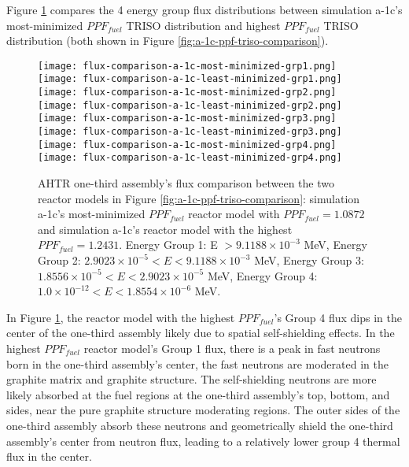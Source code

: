 Figure \ref{fig:a-1c-flux-comparison} compares the 4 energy group flux distributions 
between simulation a-1c's most-minimized $PPF_{fuel}$ TRISO distribution and highest 
$PPF_{fuel}$ TRISO distribution (both shown in Figure \ref{fig:a-1c-ppf-triso-comparison}). 
\begin{figure}[htbp!]
    \centering
    \texttt{[image: flux-comparison-a-1c-most-minimized-grp1.png]} 
    \texttt{[image: flux-comparison-a-1c-least-minimized-grp1.png]} 
    \texttt{[image: flux-comparison-a-1c-most-minimized-grp2.png]} 
    \texttt{[image: flux-comparison-a-1c-least-minimized-grp2.png]} 
    \texttt{[image: flux-comparison-a-1c-most-minimized-grp3.png]} 
    \texttt{[image: flux-comparison-a-1c-least-minimized-grp3.png]} 
    \texttt{[image: flux-comparison-a-1c-most-minimized-grp4.png]} 
    \texttt{[image: flux-comparison-a-1c-least-minimized-grp4.png]} 
    \caption{AHTR one-third assembly's flux comparison between the two reactor models 
    in Figure \ref{fig:a-1c-ppf-triso-comparison}: simulation a-1c's most-minimized 
    $PPF_{fuel}$ reactor model with $PPF_{fuel} = 1.0872$ and simulation a-1c's reactor 
    model with the highest $PPF_{fuel} = 1.2431$.
    Energy Group 1: E $> 9.1188 \times 10^{-3}$ MeV, 
    Energy Group 2: $2.9023 \times 10^{-5} < E < 9.1188 \times 10^{-3}$ MeV,
    Energy Group 3:  $1.8556 \times 10^{-5} < E < 2.9023 \times 10^{-5}$ MeV,
    Energy Group 4:  $1.0 \times 10^{-12} < E < 1.8554 \times 10^{-6}$ MeV.}
    \label{fig:a-1c-flux-comparison}
\end{figure}
In Figure \ref{fig:a-1c-flux-comparison}, the reactor model with the highest 
$PPF_{fuel}$'s Group 4 flux dips in the center of the one-third assembly likely
due to spatial self-shielding effects. 
In the highest $PPF_{fuel}$ reactor model's Group 1 flux, there is a peak in 
fast neutrons born in the one-third assembly's center, the fast neutrons are 
moderated in the graphite matrix and graphite structure.
The self-shielding neutrons are more likely absorbed at the fuel regions at the 
one-third assembly's top, bottom, and sides, near the pure graphite structure 
moderating regions. 
The outer sides of the one-third assembly absorb these neutrons and geometrically 
shield the one-third assembly's center from neutron flux, leading to a relatively 
lower group 4 thermal flux in the center. 

